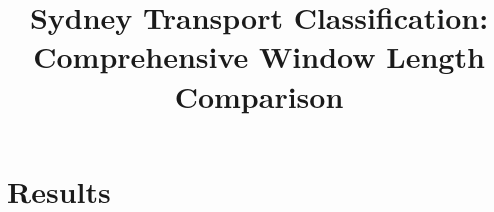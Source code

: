 \documentclass[11pt,a4paper]{article}
\title{Sydney Transport Classification: Comprehensive Window Length Comparison}
\author{}
\date{}
\begin{document}
\maketitle

\graphicspath{{../results/}}
\section{Results}

\end{document}
